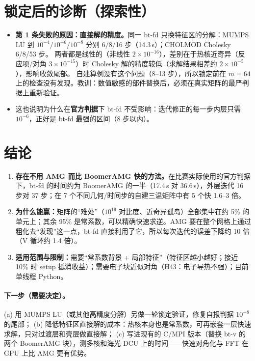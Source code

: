 \documentclass[11pt,a4paper]{ctexart}
\begin{document}
\section{锁定后的诊断（探索性）}
\begin{itemize}
\item \textbf{第 1 条失败的原因：直接解的精度。}同一 bt-fd 只换特征区的分解：MUMPS LU 到 $10^{-4}/10^{-6}/10^{-8}$ 分别 6/8/16 步（14.3\,s）；CHOLMOD Cholesky 6/8/53 步。
两者都是线性的（非线性 $2\times10^{-16}$），差别在于热核近奇异（反应项/对角 $3\times10^{-15}$）时 Cholesky 解的精度较低（求解结果相差约 $2\times10^{-5}$），影响收敛尾部。
自建算例没有这个问题（8--13 步），所以锁定前在 $m=64$ 上的检查没有发现。教训：数值敏感的部件替换后，必须在真实矩阵的最严判据上重新验证。
\item 这也说明为什么在\textbf{官方判据}下 bt-fd 不受影响：迭代修正的每一步内层只需 $10^{-6}$，正好是 bt-fd 最强的区间（8 步以内）。
\end{itemize}

\section{结论}
\begin{enumerate}
\item \textbf{存在不用 AMG 而比 BoomerAMG 快的方法。}在比赛实际使用的官方判据下，bt-fd 的时间约为 BoomerAMG 的一半（17.4\,s 对 36.6\,s），外层迭代 16 步对 37 步；在 7 个不同几何/时间步的自建三温矩阵中有 5 个快 1.6--3 倍。
\item \textbf{为什么能赢：}矩阵的“难处”（$10^{19}$ 对比度、近奇异孤岛）全部集中在约 5\% 的单元上；其余 95\% 是常系数，可以精确快速求逆。AMG 要在整个网格上通过粗化去“发现”这一点，bt-fd 直接利用了它，所以每次迭代的误差下降约 10 倍（V 循环约 1.4 倍）。
\item \textbf{适用范围与限制：}需要“常系数背景 + 局部特征”（特征区越小越好；接近 10\% 时 setup 抵消收益）；需要电子块近似对角（H43：电子导热不强）；目前单线程 Python。
\end{enumerate}

\paragraph{下一步（需要决定）。}
(a) 用 MUMPS LU（或其他高精度分解）另做一轮锁定验证，修复自报判据 $10^{-8}$ 的尾部；
(b) 降低特征区直接解的成本：热核本身也是常系数，可再嵌套一层快速求解，只对过渡层和壳层做直接解；
(c) 写进现有的 C/MPI 版本（替换 bt-v 的两个 BoomerAMG 块），测多核和海光 DCU 上的时间——快速对角化与 FFT 在 GPU 上比 AMG 更有优势。
\end{document}
